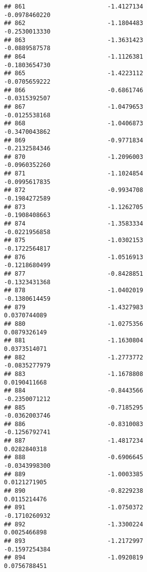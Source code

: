 \documentclass[
]{article}
\begin{document}
\begin{verbatim}
## 861                       -1.4127134                         -0.0978460220
## 862                       -1.1804483                         -0.2530013330
## 863                       -1.3631423                         -0.0889587578
## 864                       -1.1126381                         -0.1803654730
## 865                       -1.4223112                         -0.0705659222
## 866                       -0.6861746                         -0.0315392507
## 867                       -1.0479653                         -0.0125538168
## 868                       -1.0406873                         -0.3470043862
## 869                       -0.9771834                         -0.2132584346
## 870                       -1.2096003                         -0.0960352260
## 871                       -1.1024854                         -0.0995617835
## 872                       -0.9934708                         -0.1984272589
## 873                       -1.1262705                         -0.1908408663
## 874                       -1.3583334                         -0.0221956858
## 875                       -1.0302153                         -0.1722564817
## 876                       -1.0516913                         -0.1218680499
## 877                       -0.8428851                         -0.1323431368
## 878                       -1.0402019                         -0.1380614459
## 879                       -1.4327983                          0.0370744089
## 880                       -1.0275356                          0.0879326149
## 881                       -1.1630804                          0.0373514071
## 882                       -1.2773772                         -0.0835277979
## 883                       -1.1678808                          0.0190411668
## 884                       -0.8443566                         -0.2350071212
## 885                       -0.7185295                         -0.0362003746
## 886                       -0.8310083                         -0.1256792741
## 887                       -1.4817234                          0.0282840318
## 888                       -0.6906645                         -0.0343998300
## 889                       -1.0003385                          0.0121271905
## 890                       -0.8229238                          0.0115214476
## 891                       -1.0750372                         -0.1710260932
## 892                       -1.3300224                          0.0025466898
## 893                       -1.2172997                         -0.1597254384
## 894                       -1.0920819                          0.0756788451

\end{verbatim}
\end{document}
